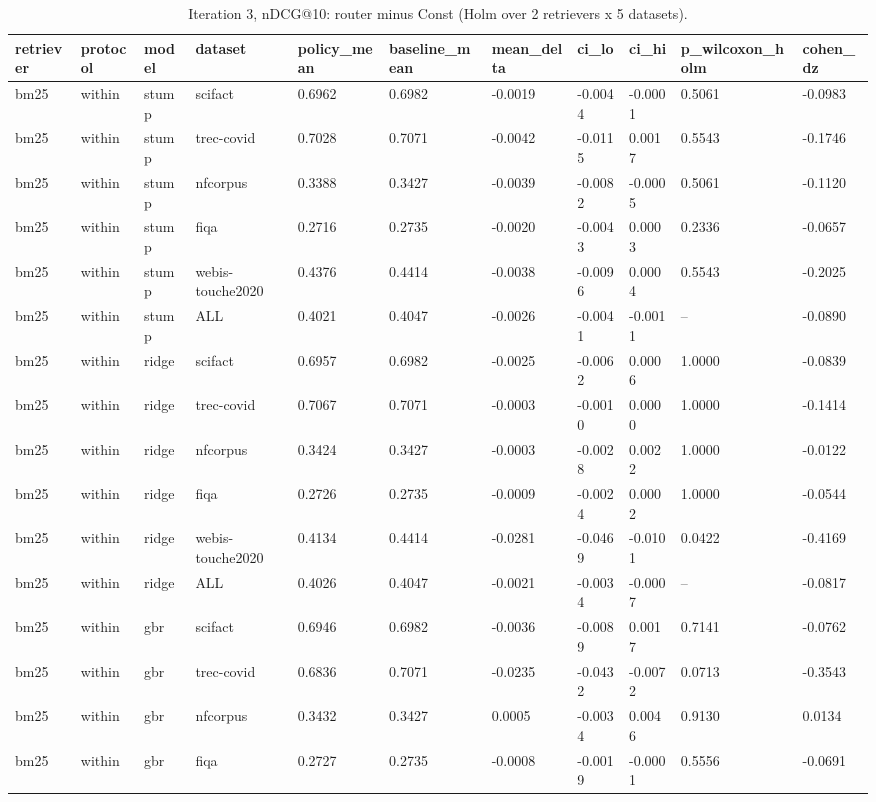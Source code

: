 \begin{table}[t]\centering\small
\caption{Iteration 3, nDCG@10: router minus Const (Holm over 2 retrievers x 5 datasets).}\label{tab:c1}
\begin{tabular}{lllllllllll}
\toprule
retriever & protocol & model & dataset & policy\_mean & baseline\_mean & mean\_delta & ci\_lo & ci\_hi & p\_wilcoxon\_holm & cohen\_dz \\
\midrule
bm25 & within & stump & scifact & 0.6962 & 0.6982 & -0.0019 & -0.0044 & -0.0001 & 0.5061 & -0.0983 \\
bm25 & within & stump & trec-covid & 0.7028 & 0.7071 & -0.0042 & -0.0115 & 0.0017 & 0.5543 & -0.1746 \\
bm25 & within & stump & nfcorpus & 0.3388 & 0.3427 & -0.0039 & -0.0082 & -0.0005 & 0.5061 & -0.1120 \\
bm25 & within & stump & fiqa & 0.2716 & 0.2735 & -0.0020 & -0.0043 & 0.0003 & 0.2336 & -0.0657 \\
bm25 & within & stump & webis-touche2020 & 0.4376 & 0.4414 & -0.0038 & -0.0096 & 0.0004 & 0.5543 & -0.2025 \\
bm25 & within & stump & ALL & 0.4021 & 0.4047 & -0.0026 & -0.0041 & -0.0011 & -- & -0.0890 \\
bm25 & within & ridge & scifact & 0.6957 & 0.6982 & -0.0025 & -0.0062 & 0.0006 & 1.0000 & -0.0839 \\
bm25 & within & ridge & trec-covid & 0.7067 & 0.7071 & -0.0003 & -0.0010 & 0.0000 & 1.0000 & -0.1414 \\
bm25 & within & ridge & nfcorpus & 0.3424 & 0.3427 & -0.0003 & -0.0028 & 0.0022 & 1.0000 & -0.0122 \\
bm25 & within & ridge & fiqa & 0.2726 & 0.2735 & -0.0009 & -0.0024 & 0.0002 & 1.0000 & -0.0544 \\
bm25 & within & ridge & webis-touche2020 & 0.4134 & 0.4414 & -0.0281 & -0.0469 & -0.0101 & 0.0422 & -0.4169 \\
bm25 & within & ridge & ALL & 0.4026 & 0.4047 & -0.0021 & -0.0034 & -0.0007 & -- & -0.0817 \\
bm25 & within & gbr & scifact & 0.6946 & 0.6982 & -0.0036 & -0.0089 & 0.0017 & 0.7141 & -0.0762 \\
bm25 & within & gbr & trec-covid & 0.6836 & 0.7071 & -0.0235 & -0.0432 & -0.0072 & 0.0713 & -0.3543 \\
bm25 & within & gbr & nfcorpus & 0.3432 & 0.3427 & 0.0005 & -0.0034 & 0.0046 & 0.9130 & 0.0134 \\
bm25 & within & gbr & fiqa & 0.2727 & 0.2735 & -0.0008 & -0.0019 & -0.0001 & 0.5556 & -0.0691 \\

\end{tabular}
\end{table}

